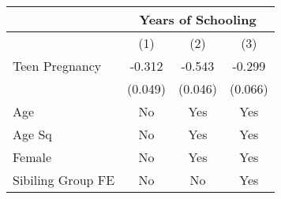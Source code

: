 \begin{tabular}{lccc}\hline
& \multicolumn{3}{c}{Years of Schooling} \\ \hline
& (1)  & (2) & (3) \\  \hline
Teen Pregnancy & -0.312 & -0.543 & -0.299  \\
& (0.049) & (0.046) & (0.066)  \\ \hline
Age & No & Yes & Yes  \\
Age Sq & No & Yes & Yes  \\
Female & No & Yes & Yes  \\
Sibiling Group FE & No & No & Yes \\ \hline
\end{tabular}
